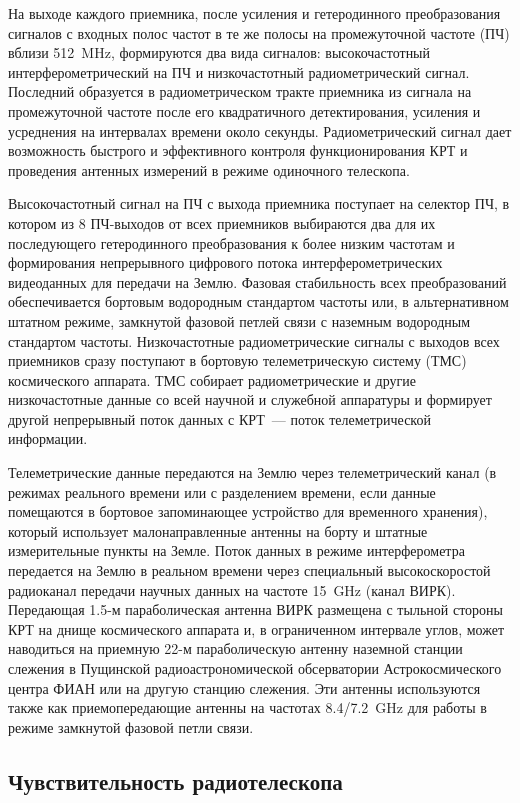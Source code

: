 На выходе каждого приемника, после усиления и гетеродинного преобразования сигналов с входных полос
частот в те же полосы на промежуточной частоте (ПЧ) вблизи \SI{512}{\MHz}, формируются два вида
сигналов: высокочастотный интерферометрический на ПЧ и низкочастотный радиометрический сигнал.
Последний образуется в радиометрическом тракте приемника из сигнала на промежуточной частоте после
его квадратичного детектирования, усиления и усреднения на интервалах времени около секунды.
Радиометрический сигнал дает возможность быстрого и эффективного контроля функционирования КРТ и
проведения антенных измерений в режиме одиночного телескопа.

Высокочастотный сигнал на ПЧ с выхода приемника поступает на селектор ПЧ, в котором из 8 ПЧ-выходов
от всех приемников выбираются два для их последующего гетеродинного преобразования к более низким
частотам и формирования непрерывного цифрового потока интерферометрических видеоданных для передачи
на Землю. Фазовая стабильность всех преобразований обеспечивается бортовым водородным стандартом
частоты или, в альтернативном штатном режиме, замкнутой фазовой петлей связи с наземным водородным
стандартом частоты. Низкочастотные радиометрические сигналы с выходов всех приемников сразу
поступают в бортовую телеметрическую систему (ТМС) космического аппарата. ТМС собирает
радиометрические и другие низкочастотные данные со всей научной и служебной аппаратуры и формирует
другой непрерывный поток данных с КРТ~--- поток телеметрической информации.

Телеметрические данные передаются на Землю через телеметрический канал (в режимах реального времени
или с разделением времени, если данные помещаются в бортовое запоминающее устройство для временного
хранения), который использует малонаправленные антенны на борту и штатные измерительные пункты на
Земле. Поток данных в режиме интерферометра передается на Землю в реальном времени через специальный
высокоскоростой радиоканал передачи научных данных на частоте \SI{15}{\GHz} (канал ВИРК). Передающая
1.5-м параболическая антенна ВИРК размещена с тыльной стороны КРТ на днище космического аппарата и,
в ограниченном интервале углов, может наводиться на приемную 22-м параболическую антенну наземной
станции слежения в Пущинской радиоастрономической обсерватории Астрокосмического центра ФИАН или на
другую станцию слежения. Эти антенны используются также как приемопередающие антенны на частотах
\num{8.4}/\SI{7.2}{\GHz} для работы в режиме замкнутой фазовой петли связи.

\subsection{Чувствительность радиотелескопа}

